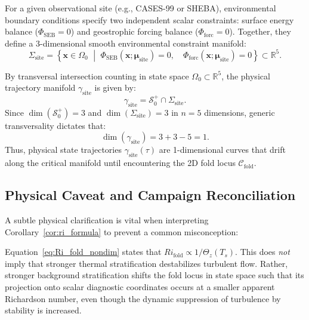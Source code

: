 \begin{definition}
For a given observational site (e.g., CASES-99 or SHEBA), environmental boundary conditions specify two independent scalar constraints: surface energy balance ($\Phi_{\mathrm{SEB}} = 0$) and geostrophic forcing balance ($\Phi_{\mathrm{forc}} = 0$). Together, they define a 3-dimensional smooth environmental constraint manifold:
\begin{equation}
\Sigma_{\mathrm{site}} = \left\{ \mathbf{x} \in \Omega_0 \,\,\middle\vert\,\, \Phi_{\mathrm{SEB}}(\mathbf{x}; \boldsymbol{\mu}_{\mathrm{site}}) = 0, \quad \Phi_{\mathrm{forc}}(\mathbf{x}; \boldsymbol{\mu}_{\mathrm{site}}) = 0 \right\} \subset \mathbb{R}^5.
\end{equation}
\end{definition}

By transversal intersection counting in state space $\Omega_0 \subset \mathbb{R}^5$, the physical trajectory manifold $\gamma_{\mathrm{site}}$ is given by:
\begin{equation}
\gamma_{\mathrm{site}} = \mathcal{S}_0^+ \cap \Sigma_{\mathrm{site}}.
\end{equation}
Since $\dim(\mathcal{S}_0^+) = 3$ and $\dim(\Sigma_{\mathrm{site}}) = 3$ in $n = 5$ dimensions, generic transversality dictates that:
\begin{equation}
\dim(\gamma_{\mathrm{site}}) = 3 + 3 - 5 = 1.
\end{equation}
Thus, physical state trajectories $\gamma_{\mathrm{site}}(\tau)$ are 1-dimensional curves that drift along the critical manifold until encountering the 2D fold locus $\mathcal{C}_{\mathrm{fold}}$.

\subsection{Physical Caveat and Campaign Reconciliation}

A subtle physical clarification is vital when interpreting Corollary~\ref{cor:ri_formula} to prevent a common misconception:

\begin{remark}
Equation~\eqref{eq:Ri_fold_nondim} states that $Ri_{\mathrm{fold}} \propto 1/\Theta_z(T_s)$. This does \emph{not} imply that stronger thermal stratification destabilizes turbulent flow. Rather, stronger background stratification shifts the fold locus in state space such that its projection onto scalar diagnostic coordinates occurs at a smaller apparent Richardson number, even though the dynamic suppression of turbulence by stability is increased.
\end{remark}

